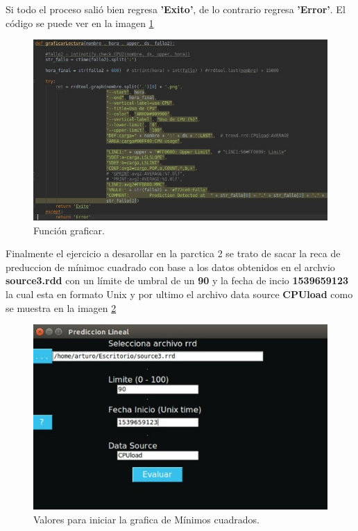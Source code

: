\begin{itemize}
Si todo el proceso salió bien regresa \textbf{'Exito'}, de lo contrario regresa \textbf{'Error'}.
El código se puede ver en la imagen \ref{image:op1} 

\FloatBarrier
\begin{figure}[htbp!]
		\centering
		    \includegraphics[width=.9 \textwidth]{../images/op1.jpeg} 
		\caption{Función graficar.}
		\label{image:op1}
\end{figure}
\FloatBarrier

\end{itemize}

Finalmente el ejercicio a desarollar en la parctica 2 se trato de sacar la reca de preduccion de mínimoc cuadrado con base a los datos obtenidos en el archvio \textbf{source3.rdd} con un límite de umbral de un \textbf{90}  y la fecha de incio \textbf{1539659123} la cual esta en formato Unix y por ultimo el archivo data source \textbf{CPUload} como se muestra en la imagen  \ref{image:inicio} 

\FloatBarrier
\begin{figure}[htbp!]
		\centering
		    \includegraphics[width=.7 \textwidth]{../images/inicio.jpeg} 
		\caption{Valores para iniciar la grafica de Mínimos cuadrados.}
		\label{image:inicio}
\end{figure}
\FloatBarrier

